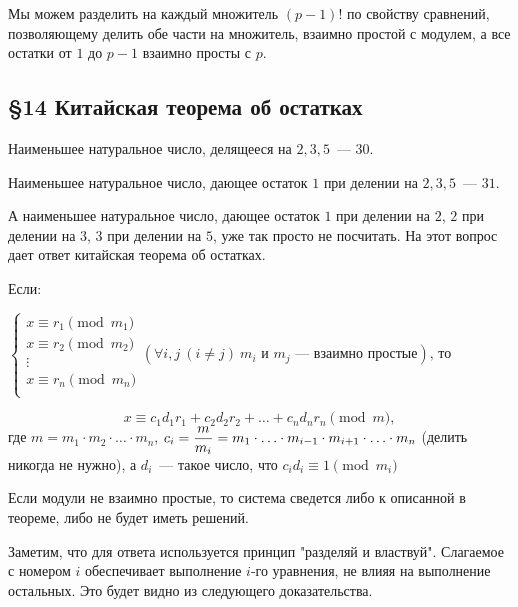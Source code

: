 \documentclass[russian]{lecture-notes}
\begin{document}
\begin{note}
	Мы можем разделить на каждый множитель $(p-1)!$ по свойству сравнений, позволяющему делить обе части на множитель, взаимно простой с модулем, а все остатки от $1$ до $p-1$ взаимно просты с $p$.
\end{note}

\begin{center}
	\section*{\LARGE\S 14 Китайская теорема об остатках}
	\label{par:kitteor}
\end{center}

Наименьшее натуральное число, делящееся на $2, 3, 5$~--- $30$.

Наименьшее натуральное число, дающее остаток $1$ при делении на $2, 3, 5$~--- $31$. 

А наименьшее натуральное число, дающее остаток $1$ при делении на $2$, $2$ при делении на $3$, $3$ при делении на $5$, уже так просто не посчитать. На этот вопрос дает ответ китайская теорема об остатках.

\begin{theorem}
	Если:
	
	$\begin{cases}
		x \equiv r_1 \pmod {m_1} \\
		x \equiv r_2 \pmod {m_2} \\
		\vdots \\
		x \equiv r_n \pmod {m_n} \\
	\end{cases} (\forall i, j \ (i \ne j) \ m_i \text{ и } m_j \text{~--- взаимно простые}) \text{, то}$
	
	\[ x \equiv c_1d_1r_1 + c_2d_2r_2 + \ldots + c_nd_nr_n \pmod m, \]где $m=m_1 \cdot m_2 \cdot \ldots \cdot m_n$, $c_i =  \displaystyle {{m}\over{m_i}} = m_1 \cdot \ldots \cdot m_{i-1} \cdot m_{i+1} \cdot \ldots \cdot m_n$ (делить никогда не нужно), а $d_i$~--- такое число, что $c_id_i \equiv 1 \pmod {m_i}$
	
\end{theorem}

\begin{note}
	Если модули не взаимно простые, то система сведется либо к описанной в теореме, либо не будет иметь решений.
	
	Заметим, что для ответа используется принцип "разделяй и властвуй". Слагаемое с номером $i$ обеспечивает выполнение $i$-го уравнения, не влияя на выполнение остальных. Это будет видно из следующего доказательства.
\end{note}
\end{document}
